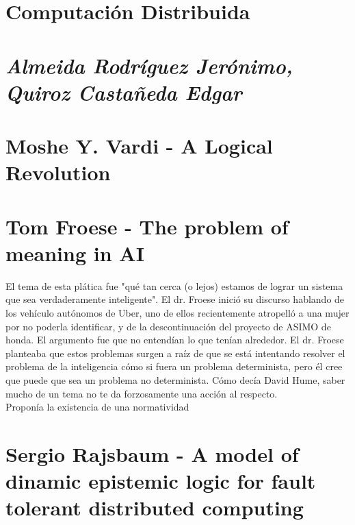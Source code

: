 \documentclass[a4paper,12pt]{article}
\begin{document}
\begin{center}
	\section*{Computación Distribuida}
	\section*{\textit{Almeida Rodríguez Jerónimo, Quiroz Castañeda Edgar}}
\end{center}
\section{Moshe Y. Vardi - A Logical Revolution}


\section{Tom Froese - The problem of meaning in AI}
El tema de esta plática fue "qué tan cerca (o lejos) estamos de lograr un sistema que sea verdaderamente inteligente". El dr. Froese inició su discurso hablando de los vehículo autónomos de Uber, uno de ellos recientemente atropelló a una mujer por no poderla identificar, y de la descontinuación del proyecto de ASIMO de honda. El argumento fue que no entendían lo que tenían alrededor.
El dr. Froese planteaba que estos problemas surgen a raíz de que se está intentando resolver el problema de la inteligencia cómo si fuera un problema determinista, pero él cree que puede que sea un problema no determinista. Cómo decía David Hume, saber mucho de un tema no te da forzosamente una acción al respecto.\\
Proponía la existencia de una normatividad

\section{Sergio Rajsbaum - A model of dinamic epistemic logic for fault tolerant distributed computing}
\end{document}
